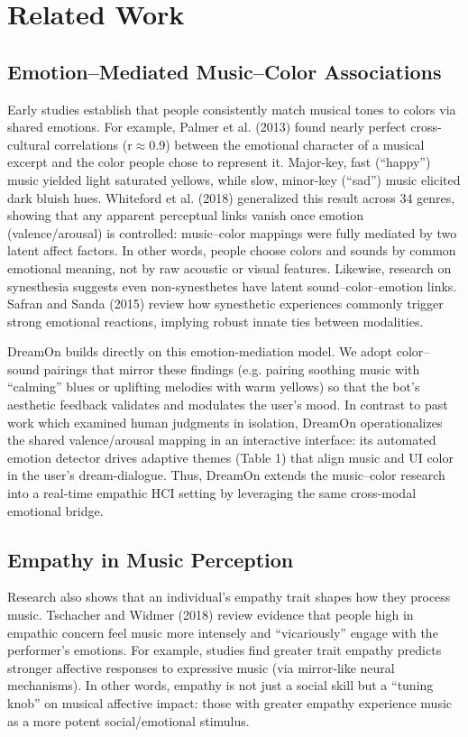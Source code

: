 \documentclass[conference]{IEEEtran}
\begin{document}
	
	\section{Related Work}
    \subsection{Emotion–Mediated Music–Color Associations}
	Early studies establish that people consistently match musical tones to colors via shared emotions. For example, Palmer et al. (2013) found nearly perfect cross-cultural correlations (r$\approx$0.9) between the emotional character of a musical excerpt and the color people chose to represent it. Major-key, fast (“happy”) music yielded light saturated yellows, while slow, minor-key (“sad”) music elicited dark bluish hues. Whiteford et al. (2018) generalized this result across 34 genres, showing that any apparent perceptual links vanish once emotion (valence/arousal) is controlled: music–color mappings were fully mediated by two latent affect factors. In other words, people choose colors and sounds by common emotional meaning, not by raw acoustic or visual features. Likewise, research on synesthesia suggests even non-synesthetes have latent sound–color–emotion links. Safran and Sanda (2015) review how synesthetic experiences commonly trigger strong emotional reactions, implying robust innate ties between modalities.

    DreamOn builds directly on this emotion-mediation model. We adopt color–sound pairings that mirror these findings (e.g. pairing soothing music with “calming” blues or uplifting melodies with warm yellows) so that the bot’s aesthetic feedback validates and modulates the user’s mood. In contrast to past work which examined human judgments in isolation, DreamOn operationalizes the shared valence/arousal mapping in an interactive interface: its automated emotion detector drives adaptive themes (Table 1) that align music and UI color in the user’s dream-dialogue. Thus, DreamOn extends the music–color research into a real-time empathic HCI setting by leveraging the same cross-modal emotional bridge.
    
    \subsection{Empathy in Music Perception}
    Research also shows that an individual’s empathy trait shapes how they process music. Tschacher and Widmer (2018) review evidence that people high in empathic concern feel music more intensely and “vicariously” engage with the performer’s emotions. For example, studies find greater trait empathy predicts stronger affective responses to expressive music (via mirror‑like neural mechanisms). In other words, empathy is not just a social skill but a “tuning knob” on musical affective impact: those with greater empathy experience music as a more potent social/emotional stimulus.
\end{document}

